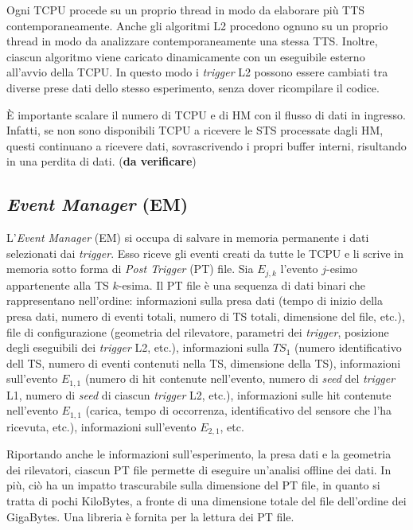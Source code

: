 \documentclass[../main.tex]{subfiles}
\begin{document}
Ogni TCPU procede su un proprio thread in modo da elaborare più TTS contemporaneamente. 
Anche gli algoritmi L2 procedono ognuno su un proprio thread in modo da analizzare contemporaneamente una stessa TTS. Inoltre, ciascun algoritmo viene caricato dinamicamente con un eseguibile esterno all'avvio della TCPU. In questo modo i \emph{trigger} L2 possono essere cambiati tra diverse prese dati dello stesso esperimento, senza dover ricompilare il codice. 

È importante scalare il numero di TCPU e di HM con il flusso di dati in ingresso. Infatti, se non sono disponibili TCPU a ricevere le STS processate dagli HM, questi continuano a ricevere dati, sovrascrivendo i propri buffer interni, risultando in una perdita di dati. (\textbf{da verificare})

\subsection{\emph{Event Manager} (EM)}
L'\emph{Event Manager} (EM) si occupa di salvare in memoria permanente i dati selezionati dai \emph{trigger}. Esso riceve gli eventi creati da tutte le TCPU e li scrive in memoria sotto forma di \emph{Post Trigger} (PT) file. Sia $E_{j, k}$ l'evento $j$-esimo appartenente alla TS $k$-esima. Il PT file è una sequenza di dati binari che rappresentano nell'ordine: informazioni sulla presa dati (tempo di inizio della presa dati, numero di eventi totali, numero di TS totali, dimensione del file, etc.), file di configurazione (geometria del rilevatore, parametri dei \emph{trigger}, posizione degli eseguibili dei \emph{trigger} L2, etc.), informazioni sulla $TS_{1}$ (numero identificativo dell TS, numero di eventi contenuti nella TS, dimensione della TS), informazioni sull'evento $E_{1,1}$ (numero di hit contenute nell'evento, numero di \emph{seed} del \emph{trigger} L1, numero di \emph{seed} di ciascun \emph{trigger} L2, etc.), informazioni sulle hit contenute nell'evento $E_{1,1}$ (carica, tempo di occorrenza, identificativo del sensore che l'ha ricevuta, etc.), informazioni sull'evento $E_{2,1}$, etc. 

Riportando anche le informazioni sull'esperimento, la presa dati e la geometria dei rilevatori, ciascun PT file permette di eseguire un'analisi offline dei dati. In più, ciò ha un impatto trascurabile sulla dimensione del PT file, in quanto si tratta di pochi KiloBytes, a fronte di una dimensione totale del file dell'ordine dei GigaBytes.
Una libreria è fornita per la lettura dei PT file.
\end{document}
